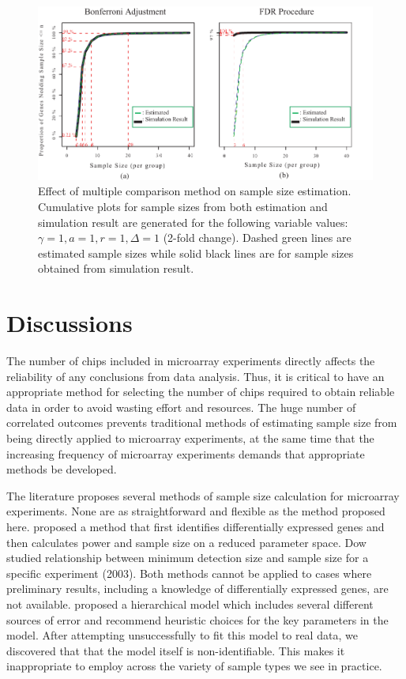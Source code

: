 \documentclass[12pt]{article}
\begin{document}
\begin{figure}%
  \caption[Effect of multiple comparison method on sample size
    estimation] {Effect of multiple comparison method on sample size
    estimation.  Cumulative plots for sample sizes from both
    estimation and simulation result are generated for the following
    variable values: $\gamma = 1, a = 1, r = 1, \Delta = 1$ (2-fold
    change). Dashed green lines are estimated sample sizes while solid
    black lines are for sample sizes obtained from simulation result.}
  \label{fig:ResMtd}
  \centerline{\includegraphics*[width=\textwidth]{ResMtd.pdf}}
\end{figure}

\section{Discussions}

The number of chips included in microarray experiments directly
affects the reliability of any conclusions from data analysis.
Thus, it is critical to have an appropriate method for selecting the
number of chips required to obtain reliable data in order to avoid
wasting effort and resources. The huge number of correlated outcomes
prevents traditional methods of estimating sample size from being
directly applied to microarray experiments, at the same time that
the increasing frequency of microarray experiments demands that
appropriate methods be developed.

The literature proposes several methods of sample size calculation
for microarray experiments. None are as straightforward and flexible
as the method proposed here. \citet{Hwang02} proposed a method that
first identifies differentially expressed genes and then calculates
power and sample size on a reduced parameter space. Dow studied
relationship between minimum detection size and sample size for a
specific experiment (2003). Both methods cannot be applied to cases
where preliminary results, including a knowledge of differentially
expressed genes, are not available. \citet{Zien03} proposed a
hierarchical model which includes several different sources of error
and recommend heuristic choices for the key parameters in the model.
After attempting unsuccessfully to fit this model to real data, we
discovered that that the model itself is non-identifiable.  This
makes it inappropriate to employ across the variety of sample types
we see in practice.
\end{document}
